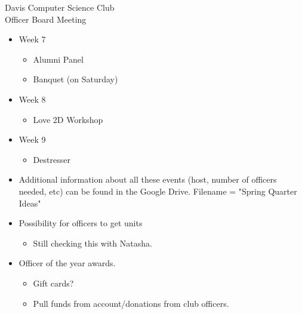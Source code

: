 \documentclass{article}
\begin{document}
\begin{Minutes}{Davis Computer Science Club\\Officer Board Meeting}
\begin{itemize}
    \item Week 7
    \begin{itemize}
        \item Alumni Panel 
        \item Banquet (on Saturday)
    \end{itemize}

    \item Week 8
    \begin{itemize}
        \item Love 2D Workshop
    \end{itemize}

    \item Week 9
    \begin{itemize}
        \item Destresser
    \end{itemize}
    
    \item Additional information about all these events (host, number of officers needed, etc) can be found in the Google Drive. Filename = "Spring Quarter Ideas"
\end{itemize}


\begin{itemize}
    \item Possibility for officers to get units
        \begin{itemize}
            \item Still checking this with Natasha.
        \end{itemize}
    \item Officer of the year awards.
        \begin{itemize}
            \item Gift cards?
            \item Pull funds from account/donations from club officers.
        \end{itemize}
\end{itemize}

\thispagestyle{creditfooter}

\end{Minutes}
\end{document}
